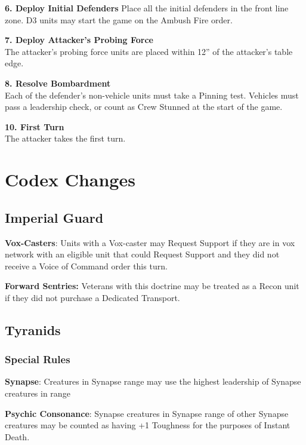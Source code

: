 \documentclass[letterpaper,twocolumn,oneside,titlepage]{book}
\begin{document}
\textbf{6. Deploy Initial Defenders} Place all the initial defenders in
the front line zone. D3 units may start the game on the Ambush Fire
order.

\textbf{7. Deploy Attacker's Probing Force}\\
The attacker's probing force units are placed within 12'' of the
attacker's table edge.

\textbf{8. Resolve Bombardment}\\
Each of the defender's non-vehicle units must take a Pinning test.
Vehicles must pass a leadership check, or count as Crew Stunned at the
start of the game.

\textbf{10. First Turn}\\
The attacker takes the first turn. \pagebreak

\chapter{\texorpdfstring{\textbf{Codex
Changes}}{Codex Changes}}\label{codex-changes}

\section{\texorpdfstring{\textbf{Imperial
Guard}}{Imperial Guard}}\label{imperial-guard}

\textbf{Vox-Casters}: Units with a Vox-caster may Request Support if
they are in vox network with an eligible unit that could Request Support
and they did not receive a Voice of Command order this turn.

\textbf{Forward Sentries:} Veterans with this doctrine may be treated as
a Recon unit if they did not purchase a Dedicated Transport.

\section{\texorpdfstring{\textbf{Tyranids}}{Tyranids}}\label{tyranids}

\subsection{\texorpdfstring{\textbf{Special
Rules}}{Special Rules}}\label{special-rules}

\textbf{Synapse}: Creatures in Synapse range may use the highest
leadership of Synapse creatures in range

\textbf{Psychic Consonance}: Synapse creatures in Synapse range of other
Synapse creatures may be counted as having +1 Toughness for the purposes
of Instant Death.
\end{document}
